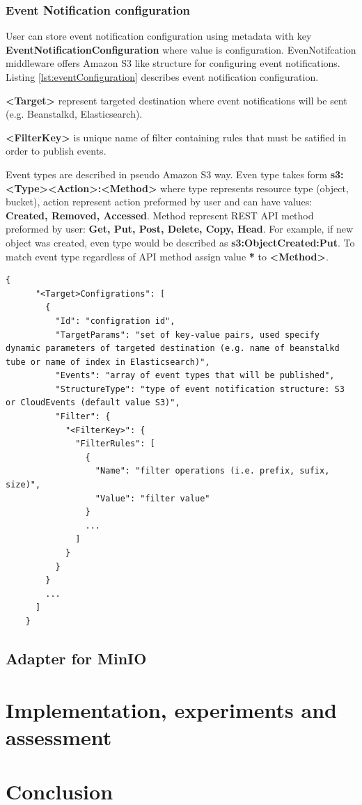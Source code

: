     \subsection{Event Notification configuration}
    User can store event notification configuration using metadata with key \textbf{EventNotificationConfiguration} where value is configuration.
    EvenNotifcation middleware offers Amazon S3 like structure for configuring event notifications.
    Listing \ref{lst:eventConfiguration} describes event notification configuration.

    \textbf{<Target>} represent targeted destination where event notifications will be sent (e.g. Beanstalkd, Elasticsearch).

    \textbf{<FilterKey>} is unique name of filter containing rules that must be satified in order to publish events.

    Event types are described in pseudo Amazon S3 way. Even type takes form \textbf{s3:<Type><Action>:<Method>} where type represents resource type (object, bucket), action represent action preformed by user and can have values: \textbf{Created, Removed, Accessed}. Method represent REST API method preformed by user: \textbf{Get, Put, Post, Delete, Copy, Head}. For example, if new object was created, even type would be described as \textbf{s3:ObjectCreated:Put}. To match event type regardless of API method assign value \textbf{*} to \textbf{<Method>}.

    \begin{lstlisting}[style=jsonStyle, caption=Strucute of event notification configuration,    label=lst:eventConfiguration]
    {
      "<Target>Configrations": [
        {
          "Id": "configration id",
          "TargetParams": "set of key-value pairs, used specify dynamic parameters of targeted destination (e.g. name of beanstalkd tube or name of index in Elasticsearch)",
          "Events": "array of event types that will be published",
          "StructureType": "type of event notification structure: S3 or CloudEvents (default value S3)",
          "Filter": {
            "<FilterKey>": {
              "FilterRules": [
                {
                  "Name": "filter operations (i.e. prefix, sufix, size)",
                  "Value": "filter value"
                }
                ...
              ]
            }
          }
        }
        ...
      ]
    }
    \end{lstlisting}


\section{Adapter for MinIO}
\chapter{Implementation, experiments and assessment}

\chapter{Conclusion}

